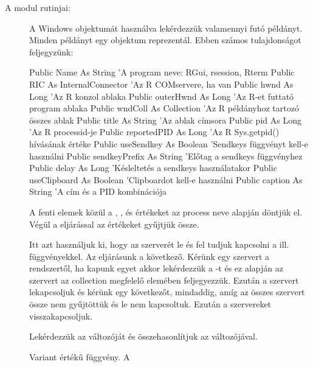 A modul rutinjai:

\begin{description}
\item[] A Windows
   objektumát
  használva lekérdezzük valamennyi futó  példányt. Minden  példányt
  egy  objektum reprezentál. Ebben számos tulajdonságot
  feljegyzünk: 
\begin{VBAframe}
Public Name As String            'A program neve: RGui, rsession, Rterm
Public RIC As InternalConnector  'Az R COMservere, ha van
Public hwnd As Long              'Az R konzol ablaka
Public outerHwnd As Long         'Az R-et futtató program ablaka
Public wndColl As Collection     'Az R példányhoz tartozó összes ablak
Public title As String           'Az ablak címsora 
Public pid As Long               'Az R processid-je
Public reportedPID As Long       'Az R Sys.getpid() hívásának értéke
Public useSendkey As Boolean     'Sendkeys függvényt kell-e használni
Public sendkeyPrefix As String   'Előtag a sendkeys függvényhez
Public delay As Long             'Késleltetés a sendkeys használatakor
Public useClipboard As Boolean   'Clipboardot kell-e használni
Public caption As String         'A cím és a PID kombinációja
\end{VBAframe}
  A fenti elemek közül a , ,
   és  értékeket az  process neve
  alapján döntjük el.  Végül 
  a  eljárással az  értékeket gyűjtjük
  össze.  
\item[] Itt azt használjuk ki, hogy az 
   szerverét le és 
  fel tudjuk kapcsolni a 
  ill.  
   függvényekkel. Az eljárásunk a következő. Kérünk egy  szervert
  a rendszertől, ha kapunk egyet akkor lekérdezzük a -t és
  ez alapján az  szervert az  collection
  megfelelő elemében 
  feljegyezzük. Ezután a szervert lekapcsoljuk és kérünk egy
  következőt, mindaddig, amíg az összes  szervert össze nem
  gyűjtöttük és le nem kapcsoltuk. Ezután %
  a szervereket visszakapcsoljuk.
\item[]
  Lekérdezzük az   változóját és összehasonlítjuk az 
   változójával.
\item[] Variant értékű függvény. A 

\end{description}
